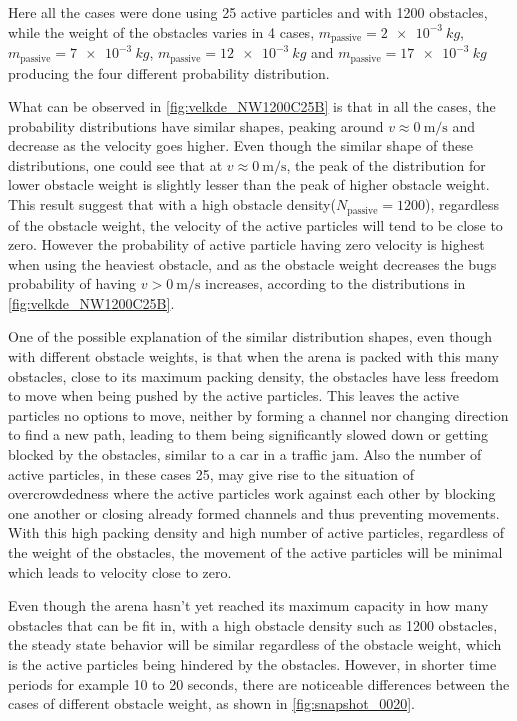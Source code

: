 Here all the cases were done using 25 active particles and with 1200 obstacles, while 
the weight of the obstacles varies in 4 cases, $m_{\text{passive}}=\SI{2e-3}{kg}$, 
$m_{\text{passive}}=\SI{7e-3}{kg}$, $m_{\text{passive}}=\SI{12e-3}{kg}$ and 
$m_{\text{passive}}=\SI{17e-3}{kg}$ producing the four different probability distribution.

What can be observed in \cref{fig:velkde_NW1200C25B} 
is that in all the cases, the probability distributions have similar shapes, peaking around $v\approx\SI{0}{\metre\per\second}$ 
and decrease as the velocity goes higher. Even though the similar shape of these distributions, 
one could see that at $v\approx\SI{0}{\metre\per\second}$, 
the peak of the distribution for lower obstacle weight is slightly lesser than the peak of higher obstacle weight. 
This result suggest that with a high obstacle density($N_{\text{passive}}=1200$), regardless of the obstacle weight, 
the velocity of the active particles will tend to 
be close to zero. However the probability of active particle having zero velocity is highest when using the heaviest obstacle, 
and as the obstacle weight decreases the bugs probability of having $v>\SI{0}{\metre\per\second}$ increases, according 
to the distributions in \cref{fig:velkde_NW1200C25B}.

One of the possible explanation of the similar distribution shapes, even though with different obstacle weights, is that when the arena
is packed with this many obstacles, close to its maximum packing density, the obstacles have less freedom to move 
when being pushed by the active particles. This leaves the active particles no options to move, neither 
by forming a channel nor changing direction to find a new path, leading to them being significantly 
slowed down or getting blocked by the obstacles, similar to a car in a traffic jam. 
Also the number of active particles, in these cases 25, 
may give rise to the situation of overcrowdedness where the active particles work against each other 
by blocking one another or closing already formed channels and thus preventing movements. 
With this high packing density and high number of active particles, regardless of the weight of the 
obstacles, the movement of the active particles will be minimal which leads to velocity close to zero.

Even though the arena hasn't yet reached its maximum capacity in how many obstacles that can be fit in, 
with a high obstacle density such as 1200 obstacles, the steady state behavior will be similar regardless 
of the obstacle weight, which is the active particles being hindered by the obstacles. However, in shorter time periods for example 
10 to 20 seconds, there are noticeable differences between the cases of different obstacle weight, as shown in \cref{fig:snapshot_0020}.

